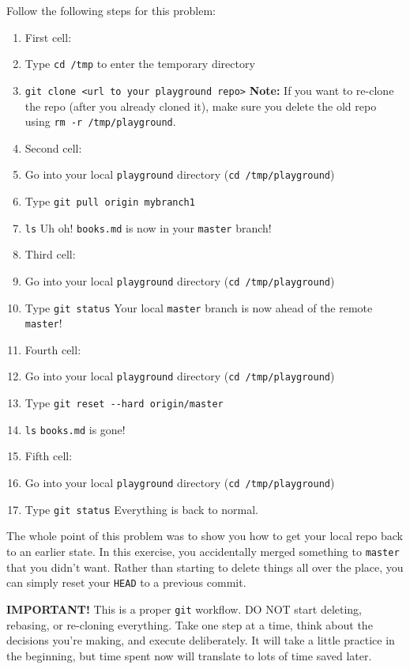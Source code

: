 \documentclass[11pt]{article}
\providecommand{\tightlist}{%
      \setlength{\itemsep}{0pt}\setlength{\parskip}{0pt}}
\begin{document}
Follow the following steps for this problem:

\begin{enumerate}
\def\labelenumi{\arabic{enumi}.}
\tightlist
\item
  First cell:
\item
  Type \texttt{cd\ /tmp} to enter the temporary directory
\item
  \texttt{git\ clone\ \textless{}url\ to\ your\ playground\ repo\textgreater{}}
  \textbf{Note:} If you want to re-clone the repo (after you already
  cloned it), make sure you delete the old repo using
  \texttt{rm\ -r\ /tmp/playground}.
\item
  Second cell:
\item
  Go into your local \texttt{playground} directory
  (\texttt{cd\ /tmp/playground})
\item
  Type \texttt{git\ pull\ origin\ mybranch1}
\item
  \texttt{ls} Uh oh! \texttt{books.md} is now in your \texttt{master}
  branch!
\item
  Third cell:
\item
  Go into your local \texttt{playground} directory
  (\texttt{cd\ /tmp/playground})
\item
  Type \texttt{git\ status} Your local \texttt{master} branch is now
  ahead of the remote \texttt{master}!
\item
  Fourth cell:
\item
  Go into your local \texttt{playground} directory
  (\texttt{cd\ /tmp/playground})
\item
  Type \texttt{git\ reset\ -\/-hard\ origin/master}
\item
  \texttt{ls} \texttt{books.md} is gone!
\item
  Fifth cell:
\item
  Go into your local \texttt{playground} directory
  (\texttt{cd\ /tmp/playground})
\item
  Type \texttt{git\ status} Everything is back to normal.
\end{enumerate}

The whole point of this problem was to show you how to get your local
repo back to an earlier state. In this exercise, you accidentally merged
something to \texttt{master} that you didn't want. Rather than starting
to delete things all over the place, you can simply reset your
\texttt{HEAD} to a previous commit.

\textbf{IMPORTANT!} This is a proper \texttt{git} workflow. DO NOT start
deleting, rebasing, or re-cloning everything. Take one step at a time,
think about the decisions you're making, and execute deliberately. It
will take a little practice in the beginning, but time spent now will
translate to lots of time saved later.
\end{document}
